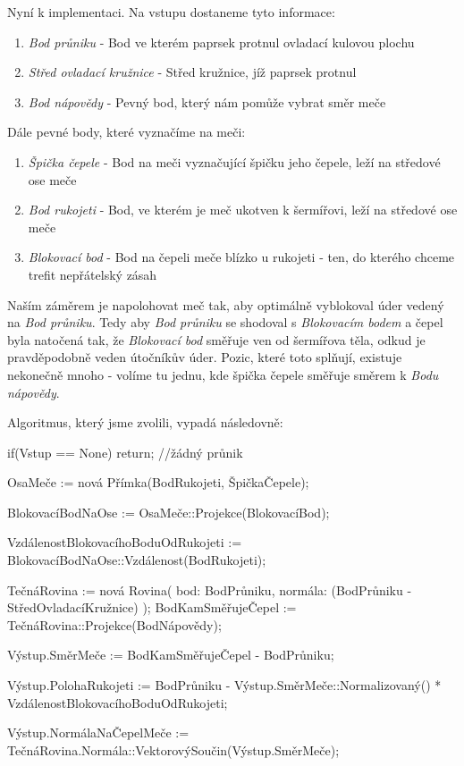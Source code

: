 \pagebreak

Nyní k implementaci. Na vstupu dostaneme tyto informace:
\begin{enumerate}
    \item \textit{Bod průniku} - Bod ve kterém paprsek protnul ovladací kulovou plochu
    \item \textit{Střed ovladací kružnice} - Střed kružnice, jíž paprsek protnul
    \item \textit{Bod nápovědy} - Pevný bod, který nám pomůže vybrat směr meče
\end{enumerate}

Dále pevné body, které vyznačíme na meči:
\begin{enumerate}
    \item \textit{Špička čepele} - Bod na meči vyznačující špičku jeho čepele, leží na středové ose meče
    \item \textit{Bod rukojeti} - Bod, ve kterém je meč ukotven k šermířovi, leží na středové ose meče
    \item \textit{Blokovací bod} - Bod na čepeli meče blízko u rukojeti - ten, do kterého chceme trefit nepřátelský zásah 
\end{enumerate}

Naším záměrem je napolohovat meč tak, aby optimálně vyblokoval úder vedený na \textit{Bod průniku}. Tedy aby \textit{Bod průniku} se shodoval s \textit{Blokovacím bodem} a čepel byla natočená tak, že \textit{Blokovací bod} směřuje ven od šermířova těla, odkud je pravděpodobně veden útočníkův úder. Pozic, které toto splňují, existuje nekonečně mnoho - volíme tu jednu, kde špička čepele směřuje směrem k \textit{Bodu nápovědy}.

Algoritmus, který jsme zvolili, vypadá následovně:
\begin{code}
 if(Vstup == None) return; //žádný průnik

 OsaMeče := nová Přímka(BodRukojeti, ŠpičkaČepele);

 BlokovacíBodNaOse := OsaMeče::Projekce(BlokovacíBod);

 VzdálenostBlokovacíhoBoduOdRukojeti := 
    BlokovacíBodNaOse::Vzdálenost(BodRukojeti);


 TečnáRovina := nová Rovina(
    bod: BodPrůniku, 
    normála: (BodPrůniku - StředOvladacíKružnice) 
 );
 BodKamSměřujeČepel := TečnáRovina::Projekce(BodNápovědy);


 Výstup.SměrMeče := BodKamSměřujeČepel - BodPrůniku;

 Výstup.PolohaRukojeti :=
   BodPrůniku - Výstup.SměrMeče::Normalizovaný()
   * VzdálenostBlokovacíhoBoduOdRukojeti;
  
 Výstup.NormálaNaČepelMeče := 
   TečnáRovina.Normála::VektorovýSoučin(Výstup.SměrMeče);
\end{code}


